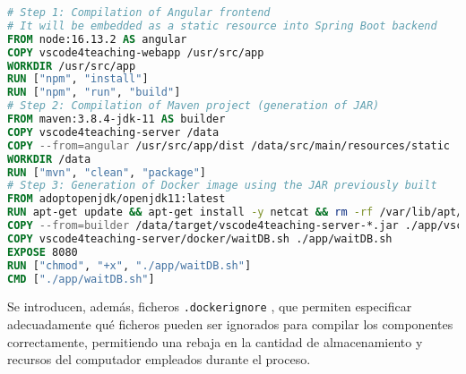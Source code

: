 \begin{lstlisting}[language=Dockerfile,caption={\textit{Dockerfile} actualizado para introducir la compilación independiente del sistema operativo y de la aplicación web.},label=cod:dockerfileNuevo]
# Step 1: Compilation of Angular frontend
# It will be embedded as a static resource into Spring Boot backend
FROM node:16.13.2 AS angular
COPY vscode4teaching-webapp /usr/src/app
WORKDIR /usr/src/app
RUN ["npm", "install"]
RUN ["npm", "run", "build"]
# Step 2: Compilation of Maven project (generation of JAR)
FROM maven:3.8.4-jdk-11 AS builder
COPY vscode4teaching-server /data
COPY --from=angular /usr/src/app/dist /data/src/main/resources/static
WORKDIR /data
RUN ["mvn", "clean", "package"]
# Step 3: Generation of Docker image using the JAR previously built
FROM adoptopenjdk/openjdk11:latest
RUN apt-get update && apt-get install -y netcat && rm -rf /var/lib/apt/lists/*
COPY --from=builder /data/target/vscode4teaching-server-*.jar ./app/vscode4teaching-server-*.jar
COPY vscode4teaching-server/docker/waitDB.sh ./app/waitDB.sh
EXPOSE 8080
RUN ["chmod", "+x", "./app/waitDB.sh"]
CMD ["./app/waitDB.sh"]
\end{lstlisting}

Se introducen, además, ficheros \texttt{.dockerignore} \cite{rn3_dockerfile}, que permiten especificar adecuadamente qué ficheros pueden ser ignorados para compilar los componentes correctamente, permitiendo una rebaja en la cantidad de almacenamiento y recursos del computador empleados durante el proceso.